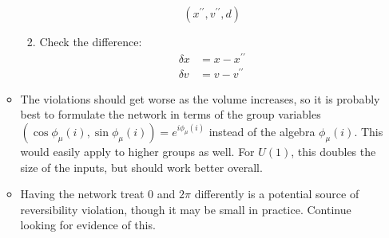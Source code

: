 \begin{itemize}
\begin{itemize}
\begin{enumerate}
\begin{equation}
              (x^{\prime\prime}, v^{\prime\prime}, d)
            \end{equation}
          \item Check the difference:
            \begin{align}
              \delta x &= x - x^{\prime\prime} \\
              \delta v &= v - v^{\prime\prime}
            \end{align}
        \end{enumerate}
%
      \item \textbf{\color{red}{(AI2):}} The violations should get worse as the volume
        increases, so it is probably best to formulate the network in terms of
        the group variables \((\cos\phi_{\mu}(i),\sin\phi_{\mu}(i)) =
        e^{i\phi_{\mu}(i)}\) instead of the algebra \(\phi_{\mu}(i)\).
        This would easily apply to higher groups as well. For \(U(1)\), this
        doubles the size of the inputs, but should work better overall.
      \item Having the network treat \(0\) and \(2\pi\) differently is a
        potential source of reversibility violation, though it may be small in
        practice.  Continue looking for evidence of this.

\end{itemize}
\end{itemize}
